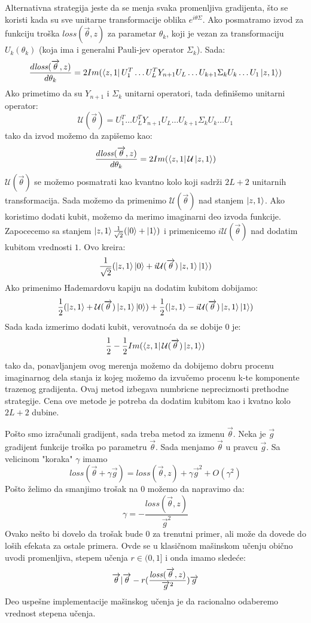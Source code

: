 \documentclass[12pt, letterpaper, oneside]{article}
\begin{document}
Alternativna strategija jeste da se menja svaka promenljiva gradijenta, što se koristi kada su sve unitarne transformacije oblika $e^{i\theta\Sigma}$.
Ako posmatramo izvod za funkciju troška $\mathit{loss}(\overrightarrow{\theta},z)$ za parametar $\theta_k$, koji je vezan za transformaciju $U_k(\theta_k)$
(koja ima i generalni Pauli-jev operator $\Sigma_k$). Sada:
\[
    \frac{d\mathit{loss}(\overrightarrow{\theta},z)}{d\theta_k} = 2Im(\Bra{z,1}U_1^T \dots U_L^TY_{n+1}U_L \dots U_{k+1} \Sigma_k U_k \dots U_1 \Ket{z,1})
\]
Ako primetimo da su $Y_{n+1}$ i $\Sigma_k$ unitarni operatori, tada definišemo unitarni operator:
\[
    \mathcal{U}(\overrightarrow{\theta}) = U_1^T \dots U_L^TY_{n+1}U_L \dots U_{k+1} \Sigma_k U_k \dots U_1
\]
tako da izvod možemo da zapišemo kao:
\[
    \frac{d\mathit{loss}(\overrightarrow{\theta},z)}{d\theta_k} = 2Im(\Bra{z,1}\mathcal{U}\Ket{z,1})
\]
$\mathcal{U}(\overrightarrow{\theta})$ se možemo posmatrati kao kvantno kolo koji sadrži $2L+2$ unitarnih transformacija.
Sada možemo da primenimo $\mathcal{U}(\overrightarrow{\theta})$ nad stanjem $\Ket{z,1}$. Ako koristimo dodati kubit, možemo da merimo imaginarni deo
izvoda funkcije. Zapocecemo sa stanjem $\Ket{z,1}\frac{1}{\sqrt{2}}(\Ket{0}+\Ket{1})$ i primenicemo $i\mathcal{U}(\overrightarrow{\theta})$ nad dodatim kubitom vrednosti $1$.
Ovo kreira:
\[
    \frac{1}{\sqrt{2}}(\Ket{z,1}\Ket{0} + i\mathcal{U}(\overrightarrow{\theta})\Ket{z,1}\Ket{1})
\]
Ako primenimo Hademardovu kapiju na dodatim kubitom dobijamo:
\[
    \frac{1}{2}(\Ket{z,1}+\mathcal{U}(\overrightarrow{\theta})\Ket{z,1}\Ket{0}) + \frac{1}{2}(\Ket{z,1}-i\mathcal{U}(\overrightarrow{\theta})\Ket{z,1}\Ket{1})
\]
Sada kada izmerimo dodati kubit, verovatnoća da se dobije $0$ je:
\[
    \frac{1}{2} - \frac{1}{2}Im(\bra{z,1}\mathcal{U}(\overrightarrow{\theta})\Ket{z,1})
\]
tako da, ponavljanjem ovog merenja možemo da dobijemo dobru procenu imaginarnog dela stanja iz kojeg možemo da izvučemo procenu k-te komponente trazenog gradijenta.
Ovaj metod izbegava numbricne nepreciznosti prethodne strategije. Cena ove metode je potreba da dodatim kubitom kao i kvatno kolo $2L+2$ dubine.

Pošto smo izračunali gradijent, sada treba metod za izmenu $\overrightarrow{\theta}$. Neka je $\overrightarrow{g}$ gradijent funkcije troška po parametru $\overrightarrow{\theta}$.
Sada menjamo $\overrightarrow{\theta}$ u pravcu $\overrightarrow{g}$. Sa velicinom "koraka" $\gamma$ imamo
\[
    \mathit{loss}(\overrightarrow{\theta}+\gamma \overrightarrow{g}) = \mathit{loss}(\overrightarrow{\theta},z)+ \gamma \overrightarrow{g}^2 + O(\gamma^2)
\]
Pošto želimo da smanjimo trošak na $0$ možemo da napravimo da:
\[
    \gamma = -\frac{\mathit{loss}(\overrightarrow{\theta},z)}{\overrightarrow{g}^2}
\]
Ovako nešto bi dovelo da trošak bude $0$ za trenutni primer, ali može da dovede do loših efekata za ostale primera. 
Ovde se u klasičnom mašinskom učenju obično uvodi promenljiva, stepem učenja $r \in (0,1]$ i onda imamo sledeće:
\[
    \overrightarrow{\theta} \arrowvert \overrightarrow{\theta} - r(\frac{\mathit{loss}(\overrightarrow{\theta},z)}{\overrightarrow{g}^2})\overrightarrow{g}
\]
Deo uspešne implementacije mašinskog učenja je da racionalno odaberemo vrednost stepena učenja.
\end{document}

